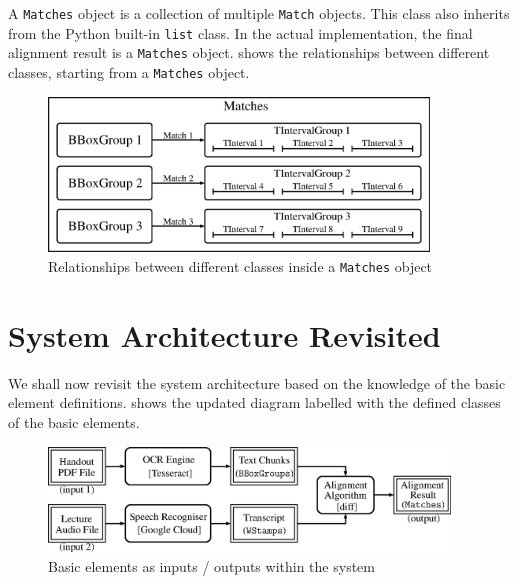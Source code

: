 A \texttt{Matches} object is a collection of multiple \texttt{Match} objects. This class also inherits from the Python built-in \texttt{list} class. In the actual implementation, the final alignment result is a \texttt{Matches} object.  shows the relationships between different classes, starting from a \texttt{Matches} object.

\begin{figure}[!htb]
    \centering
    \includegraphics[width=0.9\textwidth]{elem-matches.eps}
    \caption{Relationships between different classes inside a \texttt{Matches} object}
    \label{fig:elem-matches}
\end{figure}

\section{System Architecture Revisited}

We shall now revisit the system architecture based on the knowledge of the basic element definitions.  shows the updated diagram labelled with the defined classes of the basic elements.

\begin{figure}[!htb]
    \centering
    \includegraphics[width=0.95\textwidth]{elem-sys-diagram.eps}
    \caption{Basic elements as inputs / outputs within the system}
    \label{fig:elem-sys-diagram}
\end{figure}